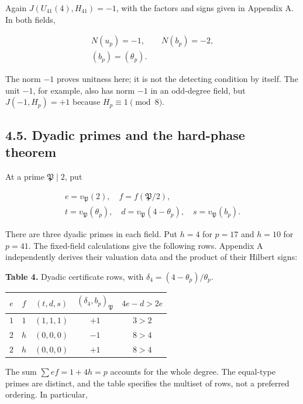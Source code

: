 \documentclass[11pt,a4paper]{article}
\newcounter{none}
\begin{document}
Again \(J(U_{41}(4),H_{41})=-1\), with the factors and signs given in
Appendix A. In both fields,

\[
\begin{gathered}
N(u_p)=-1,\qquad N(b_p)=-2,\\
(b_p)=(\theta_p).
\end{gathered}
\tag{4.11}
\]

The norm \(-1\) proves unitness here; it is not the detecting condition
by itself. The unit \(-1\), for example, also has norm \(-1\) in an
odd-degree field, but \(J(-1,H_p)=+1\) because \(H_p\equiv1\pmod8\).

\subsection{4.5. Dyadic primes and the hard-phase
theorem}\label{dyadic-data}

At a prime \(\mathfrak P\mid2\), put

\[
\begin{gathered}
e=v_{\mathfrak P}(2),\quad
f=f(\mathfrak P/2),\\
t=v_{\mathfrak P}(\theta_p),\quad
d=v_{\mathfrak P}(4-\theta_p),\quad
s=v_{\mathfrak P}(b_p).
\end{gathered}
\]

There are three dyadic primes in each field. Put \(h=4\) for \(p=17\)
and \(h=10\) for \(p=41\). The fixed-field calculations give the
following rows. Appendix A independently derives their valuation data
and the product of their Hilbert signs:

\textbf{Table 4.} Dyadic certificate rows, with
\(\delta_4=(4-\theta_p)/\theta_p\).

{\def\LTcaptype{none} %
\begin{longtable}[]{@{}ccccc@{}}
\toprule\noalign{}
\(e\) & \(f\) & \((t,d,s)\) & \((\delta_4,b_p)_{\mathfrak P}\) &
\(4e-d>2e\) \\
\midrule\noalign{}
\endhead
\bottomrule\noalign{}
\endlastfoot
\(1\) & \(1\) & \((1,1,1)\) & \(+1\) & \(3>2\) \\
\(2\) & \(h\) & \((0,0,0)\) & \(-1\) & \(8>4\) \\
\(2\) & \(h\) & \((0,0,0)\) & \(+1\) & \(8>4\) \\
\end{longtable}
}

The sum \(\sum ef=1+4h=p\) accounts for the whole degree. The equal-type
primes are distinct, and the table specifies the multiset of rows, not a
preferred ordering. In particular,
\end{document}
